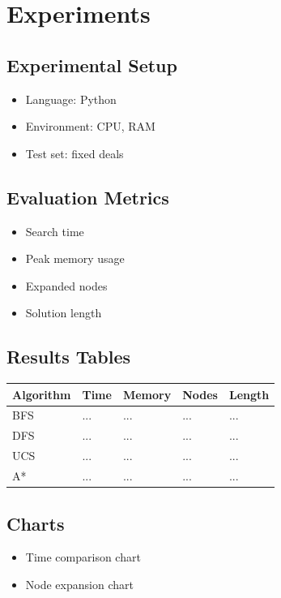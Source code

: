 \documentclass[12pt,a4paper]{article}
\begin{document}
\section{Experiments}

\subsection{Experimental Setup}
\begin{itemize}
    \item Language: Python
    \item Environment: CPU, RAM
    \item Test set: fixed deals
\end{itemize}

\subsection{Evaluation Metrics}
\begin{itemize}
    \item Search time
    \item Peak memory usage
    \item Expanded nodes
    \item Solution length
\end{itemize}

\subsection{Results Tables}
\begin{table}[H]
\centering
\begin{tabular}{lllll}
\toprule
Algorithm & Time & Memory & Nodes & Length \\
\midrule
BFS & ... & ... & ... & ... \\
DFS & ... & ... & ... & ... \\
UCS & ... & ... & ... & ... \\
A* & ... & ... & ... & ... \\
\bottomrule
\end{tabular}
\end{table}

\subsection{Charts}
\begin{itemize}
    \item Time comparison chart
    \item Node expansion chart
\end{itemize}
\end{document}
